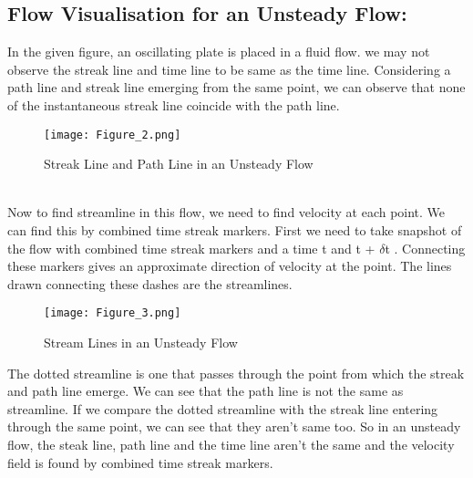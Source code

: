 \documentclass[12pt,a4paper]{article}
\begin{document}
\subsection{Flow Visualisation for an Unsteady Flow:}
In the given figure, an oscillating plate is placed in a fluid flow. we may not observe the streak line and time line to be same as the time line. Considering a path line and streak line emerging from the same point, we can observe that none of the instantaneous streak line coincide with the path line.\\
\begin{figure}[!ht]
	\begin{center}
			\texttt{[image: Figure\_2.png]}
	\end{center}
	\caption{Streak Line and Path Line in an Unsteady Flow}
\end{figure}
\\Now to find streamline in this flow, we need to find velocity at each point. We can
find this by combined time streak markers. First we need to take snapshot of the flow
with combined time streak markers and a time t and t + $\delta$t . Connecting these markers gives an approximate direction of velocity at the point. The lines drawn connecting these dashes are the streamlines.
\begin{figure}[!ht]
	\begin{center}
			\texttt{[image: Figure\_3.png]}
	\end{center}
	\caption{Stream Lines in an Unsteady Flow}
\end{figure}
\newpage
\noindent
The dotted streamline is one that passes through the point from which the
streak and path line emerge. We can see that the path line is not the same as streamline. If we compare the dotted streamline with the streak line entering through the same point, we can see that they aren’t same too. So in an unsteady flow, the steak line, path line and the time line aren’t the same and the velocity field is found by combined time streak markers.
\end{document}
